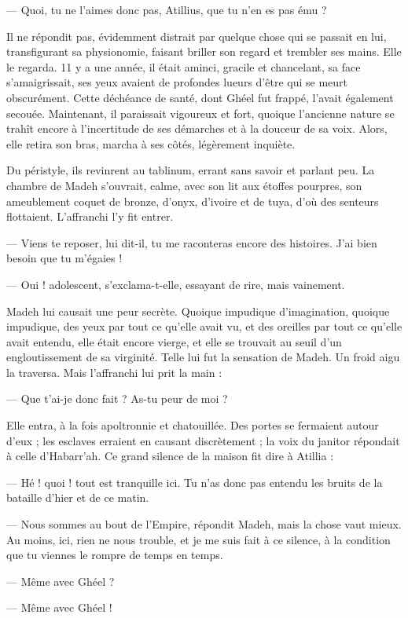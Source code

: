 \documentclass[a4paper, 11pt, oneside, polutonikogreek, french]{article}
\begin{document}
--- Quoi, tu ne l'aimes donc pas, Atillius, que tu n'en es pas ému ?

Il ne répondit pas, évidemment distrait par quelque chose qui se passait en lui, transfigurant sa physionomie, faisant briller son regard et trembler ses mains. Elle le regarda. 11 y a une année, il était aminci, gracile et chancelant, sa face s'amaigrissait, ses yeux avaient de profondes lueurs d'être qui se meurt obscurément. Cette déchéance de santé, dont Ghéel fut frappé, l'avait également secouée. Maintenant, il paraissait vigoureux et fort, quoique l'ancienne nature se trahît encore à l'incertitude de ses démarches et à la douceur de sa voix. Alors, elle retira son bras, marcha à ses côtés, légèrement inquiète.

Du péristyle, ils revinrent au tablinum, errant sans savoir et parlant peu. La chambre de Madeh s'ouvrait, calme, avec son lit aux étoffes pourpres, son ameublement coquet de bronze, d'onyx, d'ivoire et de tuya, d'où des senteurs flottaient. L'affranchi l'y fit entrer.

--- Viens te reposer, lui dit-il, tu me raconteras encore des histoires. J'ai bien besoin que tu m'égaies !

--- Oui ! adolescent, s'exclama-t-elle, essayant de rire, mais vainement.

Madeh lui causait une peur secrète. Quoique impudique d'imagination, quoique impudique, des yeux par tout ce qu'elle avait vu, et des oreilles par tout ce qu'elle avait entendu, elle était encore vierge, et elle se trouvait au seuil d'un engloutissement de sa virginité. Telle lui fut la sensation de Madeh. Un froid aigu la traversa. Mais l'affranchi lui prit la main :

--- Que t'ai-je donc fait ? As-tu peur de moi ?

Elle entra, à la fois apoltronnie et chatouillée. Des portes se fermaient autour d'eux ; les esclaves erraient en causant discrètement ; la voix du janitor répondait à celle d'Habarr'ah. Ce grand silence de la maison fit dire à Atillia :

--- Hé ! quoi ! tout est tranquille ici. Tu n'as donc pas entendu les bruits de la bataille d'hier et de ce matin.

--- Nous sommes au bout de l'Empire, répondit Madeh, mais la chose vaut mieux. Au moins, ici, rien ne nous trouble, et je me suis fait à ce silence, à la condition que tu viennes le rompre de temps en temps.

--- Même avec Ghéel ?

--- Même avec Ghéel !
\end{document}
